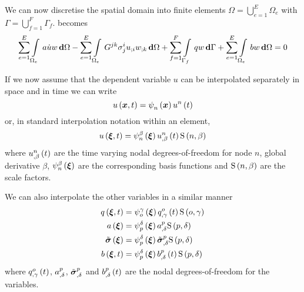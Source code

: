 We can now discretise the spatial domain into finite elements \ie $\Omega=
\displaystyle{\bigcup_{e=1}^{E}}\Omega_{e}$ with
$\Gamma=\displaystyle{\bigcup_{f=1}^{F}}\Gamma_{f}$. 
 becomes
\begin{equation}
  \dsum_{e=1}^{E}\gint{\Omega_{e}}{}{a\dot{u}w}{\Omega}-
  \dsum_{e=1}^{E}\gint{\Omega_{e}}{}{G^{jk}\sigma^{i}_{j}
    \covarderiv{u}{i}\covarderiv{w}{k}}{\Omega}+
  \dsum_{f=1}^{F}\gint{\Gamma_{f}}{}{qw}{\Gamma} +
  \dsum_{e=1}^{E}\gint{\Omega_{e}}{}{bw}{\Omega}=0
  \label{eqn:diffusionfemform}
\end{equation}

If we now assume that the dependent variable $u$ can be interpolated
separately in space and in time we can write
\begin{equation}
   u\left( \boldsymbol{x},t \right) =   \psi_{n}^{} \left( \boldsymbol{x} \right)    {u}^{n} \left( t \right) 
\end{equation}
or, in standard interpolation notation within an element,
\begin{equation}
   u\left( \boldsymbol{\xi},t \right) =   \psi_{n}^{\beta} \left( \boldsymbol{\xi} \right)  
     {u}^{n} _{,\beta} \left( t \right)    \mathrm{S} \left( n,\beta \right)  
\end{equation}
where $   {u}^{n} _{,\beta} \left( t \right) $ are the time varying nodal
degrees-of-freedom for node $n$, global derivative $\beta$,
$   \psi_{n}^{\beta} \left( \boldsymbol{\xi} \right)  $ are the corresponding basis functions 
and $   \mathrm{S} \left( n,\beta \right)  $ are the scale factors. 

We can also interpolate the other variables in a similar manner \ie
\begin{equation}
  \begin{split}
     q\left( \boldsymbol{\xi},t \right)  &=    \psi_{o}^{\gamma} \left( \boldsymbol{\xi} \right)  
       {q}^{o} _{,\gamma} \left( t \right)    \mathrm{S} \left( o,\gamma \right)   \\
     a\left( \boldsymbol{\xi} \right)  &=   \psi_{p}^{\delta} \left( \boldsymbol{\xi} \right)  
      {a}^{p} _{,\delta}    \mathrm{S} \left( p,\delta \right)   \\
     \tilde{\boldsymbol{\mathit{\sigma}}}\left( \boldsymbol{\xi} \right) 
    &=   \psi_{p}^{\delta} \left( \boldsymbol{\xi} \right)    {\tilde{\boldsymbol{\mathit{\sigma}}}}^{p} _{,\delta} 
       \mathrm{S} \left( p,\delta \right)   \\
     b\left( \boldsymbol{\xi},t \right)  &=
       \psi_{p}^{\delta} \left( \boldsymbol{\xi} \right)     {b}^{p} _{,\delta} \left( t \right)    \mathrm{S} \left( p,\delta \right)  
  \end{split}
\end{equation}
where $   {q}^{o} _{,\gamma} \left( t \right) $, $  {a}^{p} _{,\delta} $,
$  {\tilde{\boldsymbol{\mathit{\sigma}}}}^{p} _{,\delta} $ and 
$   {b}^{p} _{,\delta} \left( t \right) $ are the
nodal degrees-of-freedom for the variables.

